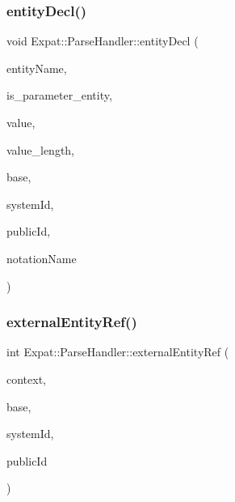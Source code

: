 \subsubsection{\texorpdfstring{entity\+Decl()}{entityDecl()}}
{\footnotesize\ttfamily void Expat\+::\+Parse\+Handler\+::entity\+Decl (\begin{DoxyParamCaption}\item[{const X\+M\+L\+\_\+\+Char $\ast$}]{entity\+Name,  }\item[{int}]{is\+\_\+parameter\+\_\+entity,  }\item[{const X\+M\+L\+\_\+\+Char $\ast$}]{value,  }\item[{int}]{value\+\_\+length,  }\item[{const X\+M\+L\+\_\+\+Char $\ast$}]{base,  }\item[{const X\+M\+L\+\_\+\+Char $\ast$}]{system\+Id,  }\item[{const X\+M\+L\+\_\+\+Char $\ast$}]{public\+Id,  }\item[{const X\+M\+L\+\_\+\+Char $\ast$}]{notation\+Name }\end{DoxyParamCaption})\hspace{0.3cm}{\ttfamily [virtual]}}

\hypertarget{class_expat_1_1_parse_handler_a54f2787ed9c5134d4a6bf7748a23c3cf}{}\label{class_expat_1_1_parse_handler_a54f2787ed9c5134d4a6bf7748a23c3cf} 
\subsubsection{\texorpdfstring{external\+Entity\+Ref()}{externalEntityRef()}}
{\footnotesize\ttfamily int Expat\+::\+Parse\+Handler\+::external\+Entity\+Ref (\begin{DoxyParamCaption}\item[{const X\+M\+L\+\_\+\+Char $\ast$}]{context,  }\item[{const X\+M\+L\+\_\+\+Char $\ast$}]{base,  }\item[{const X\+M\+L\+\_\+\+Char $\ast$}]{system\+Id,  }\item[{const X\+M\+L\+\_\+\+Char $\ast$}]{public\+Id }\end{DoxyParamCaption})\hspace{0.3cm}{\ttfamily [virtual]}}

\hypertarget{class_expat_1_1_parse_handler_a0f9bf618ebac7414e88573a743cad783}{}\label{class_expat_1_1_parse_handler_a0f9bf618ebac7414e88573a743cad783} 
